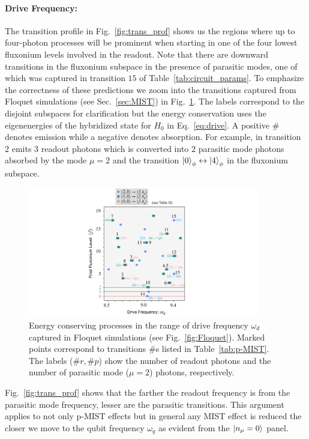 \documentclass[prx,showpacs,notitlepage,twocolumn,superscriptaddress,nofootinbib,preprintnumbers,floatfix]{revtex4-2}
\begin{document}
\paragraph{Drive Frequency:} 
The transition profile in Fig.~\ref{fig:trans_prof} shows us the regions where up to four-photon processes will be prominent when starting in one of the four lowest fluxonium levels involved in the readout. Note that there are downward transitions in the fluxonium subspace in the presence of parasitic modes, one of which was captured in transition $15$ of Table~\ref{tab:circuit_params}. To emphasize the correctness of these predictions we zoom into the transitions captured from Floquet simulations (see Sec.~\ref{sec:MIST}) in Fig.~\ref{fig:Energy_Flo}. The labels correspond to the disjoint subspaces for clarification but the energy conservation uses the eigenenergies of the hybridized state for $H_{0}$ in Eq.~\ref{eq:drive}. A positive $\#$ denotes emission while a negative denotes absorption. For example, in transition $2$ emits $3$ readout photons which is converted into $2$ parasitic mode photons absorbed by the mode $\mu=2$ and the transition $\ket{0}_\phi\leftrightarrow \ket{4}_\phi$ in the fluxonium subspace. 
\begin{figure}
    \centering
    \includegraphics[width=0.9\textwidth]{Figures/Trans_.pdf}
    \caption{Energy conserving processes in the range of drive frequency $\omega_d$ captured in Floquet simulations (see Fig.~\ref{fig:Floquet}). Marked points correspond to transitions $\#$s listed in Table~\ref{tab:p-MIST}. The labels ($\#r,\#p$) show the number of readout photons and the number of parasitic mode ($\mu=2$) photons, respectively.}
    \label{fig:Energy_Flo}
\end{figure}
Fig.~\ref{fig:trans_prof} shows that the farther the readout frequency is from the parasitic mode frequency, lesser are the parasitic transitions. This argument applies to not only p-MIST effects but in general any MIST effect is reduced the closer we move to the qubit frequency $\omega_q$ as evident from the $\ket{n_\mu=0}$ panel. 
\end{document}
